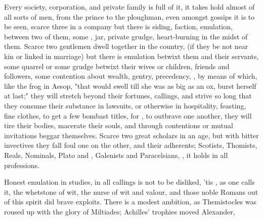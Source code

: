 
Every society, corporation, and private family is full of it, it takes hold
almost of all sorts of men, from the prince to the ploughman, even amongst
gossips it is to be seen, scarce three in a company but there is siding,
faction, emulation, between two of them, some , jar, private
grudge, heart-burning in the midst of them. Scarce two gentlemen dwell together
in the country, (if they be not near kin or linked in marriage) but there is
emulation betwixt them and their servants, some quarrel or some grudge betwixt
their wives or children, friends and followers, some contention about wealth,
gentry, precedency, \etc{}, by means of which, like the frog in
Aesop, "that would swell till she was as big as an ox,
burst herself at last;" they will stretch beyond their fortunes, callings, and
strive so long that they consume their substance in lawsuits, or otherwise in
hospitality, feasting, fine clothes, to get a few bombast titles, for
, to outbrave one another, they will
tire their bodies, macerate their souls, and through contentions or mutual
invitations beggar themselves. Scarce two great scholars in an age, but with
bitter invectives they fall foul one on the other, and their adherents;
Scotists, Thomists, Reals, Nominals, Plato and \Aristotle{}, Galenists and
Paracelsians, \etc{}, it holds in all professions.

Honest emulation in studies, in all callings is not to be
disliked, 'tis , as one calls it, the whetstone of wit, the
nurse of wit and valour, and those noble Romans out of this spirit did brave
exploits. There is a modest ambition, as Themistocles was roused up with the
glory of Miltiades; Achilles' trophies moved Alexander,

